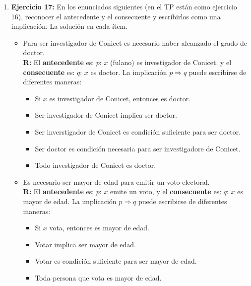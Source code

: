\documentclass[12pt]{article}
\theoremstyle{definition}
\theoremstyle{remark}
\begin{document}
\begin{enumerate}
\item \textbf{Ejercicio 17: } En los enunciados siguientes (en el TP están como ejercicio 16), reconocer el antecedente y el consecuente y escribirlos como una implicación. La solución en cada ítem. 
\begin{itemize}
\setlength\itemsep{0em}
\item Para ser investigador de Conicet es necesario haber alcanzado el grado de doctor.\\
\textbf{R:}
El \textbf{antecedente} es: $p$: $x$ (fulano) es  investigador de Conicet. y el   \textbf{consecuente} es: $q$: $x$ es doctor. La implicación $p \Rightarrow q$ puede escribirse de diferentes maneras: 
\begin{itemize}
\item Si $x$ es investigador de Conicet, entonces es doctor.
\item Ser investigador de Conicet implica ser doctor.
\item Ser inverstigador de Conicet es condición suficiente para ser doctor. 
\item Ser doctor es condición necesaria para ser investigadore de Conicet. 
\item Todo investigador de Conicet es doctor. 
\end{itemize}

\item Es necesario ser mayor de edad para emitir un voto electoral.\\
\textbf{R:}
El \textbf{antecedente} es: $p$: $x$ emite un voto, y el   \textbf{consecuente} es: $q$: $x$ es mayor de edad. La implicación $p \Rightarrow q$ puede escribirse de diferentes maneras: 
\begin{itemize}
\item Si $x$ vota, entonces es mayor de edad.
\item Votar implica ser mayor de edad.
\item Votar es condición suficiente para ser mayor de edad. 
\item Toda persona que vota es mayor de edad. 
\end{itemize}


\end{itemize}
\end{enumerate}
\end{document}
